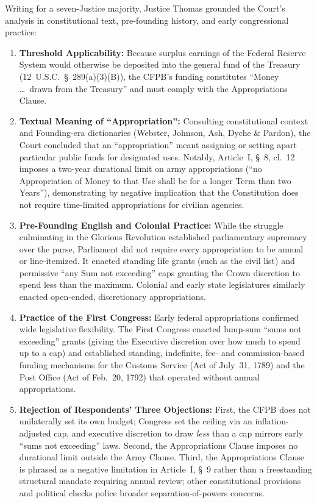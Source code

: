 \documentclass[12pt]{article}
\begin{document}
Writing for a seven-Justice majority, Justice Thomas grounded the Court's analysis in constitutional text, pre-founding history, and early congressional practice:
\begin{enumerate}
  \item \textbf{Threshold Applicability:} Because surplus earnings of the Federal Reserve System would otherwise be deposited into the general fund of the Treasury (12~U.S.C.~\S~289(a)(3)(B)), the CFPB's funding constitutes ``Money \ldots\ drawn from the Treasury'' and must comply with the Appropriations Clause.
  \item \textbf{Textual Meaning of ``Appropriation'':} Consulting constitutional context and Founding-era dictionaries (Webster, Johnson, Ash, Dyche \& Pardon), the Court concluded that an ``appropriation'' meant assigning or setting apart particular public funds for designated uses. Notably, Article~I, \S~8, cl.~12 imposes a two-year durational limit on army appropriations (``no Appropriation of Money to that Use shall be for a longer Term than two Years''), demonstrating by negative implication that the Constitution does not require time-limited appropriations for civilian agencies.
  \item \textbf{Pre-Founding English and Colonial Practice:} While the struggle culminating in the Glorious Revolution established parliamentary supremacy over the purse, Parliament did not require every appropriation to be annual or line-itemized. It enacted standing life grants (such as the civil list) and permissive ``any Sum not exceeding'' caps granting the Crown discretion to spend less than the maximum. Colonial and early state legislatures similarly enacted open-ended, discretionary appropriations.
  \item \textbf{Practice of the First Congress:} Early federal appropriations confirmed wide legislative flexibility. The First Congress enacted lump-sum ``sums not exceeding'' grants (giving the Executive discretion over how much to spend up to a cap) and established standing, indefinite, fee- and commission-based funding mechanisms for the Customs Service (Act of July~31, 1789) and the Post Office (Act of Feb.~20, 1792) that operated without annual appropriations.
  \item \textbf{Rejection of Respondents' Three Objections:} First, the CFPB does not unilaterally set its own budget; Congress set the ceiling via an inflation-adjusted cap, and executive discretion to draw \textit{less} than a cap mirrors early ``sums not exceeding'' laws. Second, the Appropriations Clause imposes no durational limit outside the Army Clause. Third, the Appropriations Clause is phrased as a negative limitation in Article~I, \S~9 rather than a freestanding structural mandate requiring annual review; other constitutional provisions and political checks police broader separation-of-powers concerns.
\end{enumerate}
\end{document}
